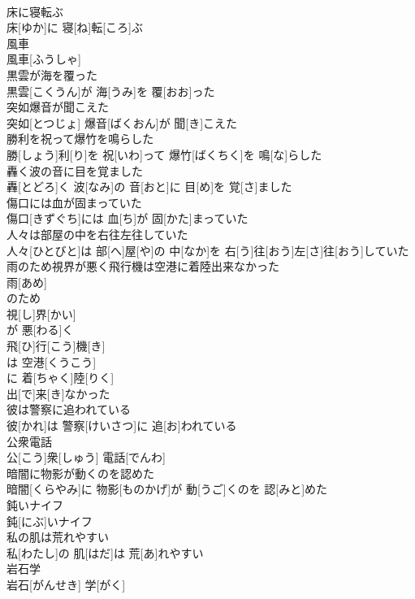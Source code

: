 \documentclass[8pt]{extreport}
\begin{document}
\begin{CJK}{UTF8}{min}
\\	床に寝転ぶ	
\\	床[ゆか]に 寝[ね]転[ころ]ぶ
\\	風車	
\\	風車[ふうしゃ]
\\	黒雲が海を覆った	
\\	黒雲[こくうん]が 海[うみ]を 覆[おお]った
\\	突如爆音が聞こえた	
\\	突如[とつじょ] 爆音[ばくおん]が 聞[き]こえた
\\	勝利を祝って爆竹を鳴らした	
\\	勝[しょう]利[り]を 祝[いわ]って 爆竹[ばくちく]を 鳴[な]らした
\\	轟く波の音に目を覚ました	
\\	轟[とどろ]く 波[なみ]の 音[おと]に 目[め]を 覚[さ]ました
\\	傷口には血が固まっていた	
\\	傷口[きずぐち]には 血[ち]が 固[かた]まっていた
\\	人々は部屋の中を右往左往していた	
\\	人々[ひとびと]は 部[へ]屋[や]の 中[なか]を 右[う]往[おう]左[さ]往[おう]していた
\\	雨のため視界が悪く飛行機は空港に着陸出来なかった	
\\	雨[あめ]
\\	のため 
\\	視[し]界[かい]
\\	が 悪[わる]く 
\\	飛[ひ]行[こう]機[き]
\\	は 空港[くうこう]
\\	に 着[ちゃく]陸[りく]
\\	出[で]来[き]なかった 
\\	彼は警察に追われている	
\\	彼[かれ]は 警察[けいさつ]に 追[お]われている
\\	公衆電話	
\\	公[こう]衆[しゅう] 電話[でんわ]
\\	暗闇に物影が動くのを認めた	
\\	暗闇[くらやみ]に 物影[ものかげ]が 動[うご]くのを 認[みと]めた
\\	鈍いナイフ	
\\	鈍[にぶ]いナイフ
\\	私の肌は荒れやすい	
\\	私[わたし]の 肌[はだ]は 荒[あ]れやすい
\\	岩石学	
\\	岩石[がんせき] 学[がく]

\end{CJK}
\end{document}
